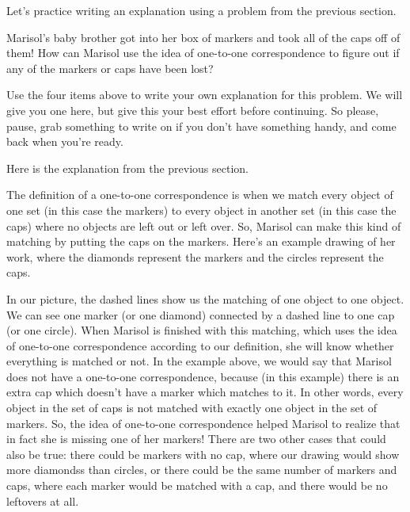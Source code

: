 \documentclass[noauthor,nooutcomes]{ximera}
\begin{document}
Let's practice writing an explanation using a problem from the previous section.



\begin{problem}
Marisol's baby brother got into her box of markers and took all of the caps off of them! How can Marisol  use the idea of one-to-one correspondence to figure out if any of the markers or caps have been lost?

\begin{prompt} %
Use the four items above to write your own explanation for this problem. We will give you one here, but give this your best effort before continuing. So please, pause, grab something to write on if you don't have something handy, and come back when you're ready.

\begin{multipleChoice}
\end{multipleChoice}
\end{prompt}



\begin{problem} Here is the explanation from the previous section.


The definition of a one-to-one correspondence is when we match every object of one set (in this case the markers) to every object in another set (in this case the caps) where no objects are left out or left over. So, Marisol can make this kind of matching by putting the caps on the markers. Here's an example drawing of her work, where the diamonds represent the markers and the circles represent the caps.
\begin{image}
\end{image}
In our picture, the dashed lines show us the matching of one object to one object. We can see one marker (or one diamond) connected by a dashed line to one cap (or one circle). When Marisol is finished with this matching, which uses the idea of one-to-one correspondence according to our definition, she will know whether everything is matched or not. In the example above, we would say that Marisol does not have a one-to-one correspondence, because (in this example) there is an extra cap which doesn't have a marker which matches to it. In other words, every object in the set of caps is not matched with exactly one object in the set of markers. So, the idea of one-to-one correspondence helped Marisol to realize that in fact she is missing one of her markers! There are two other cases that could also be true: there could be markers with no cap, where our drawing would show more diamondss than circles, or there could be the same number of markers and caps, where each marker would be matched with a cap, and there would be no leftovers at all.


\end{problem}
\end{problem}
\end{document}

